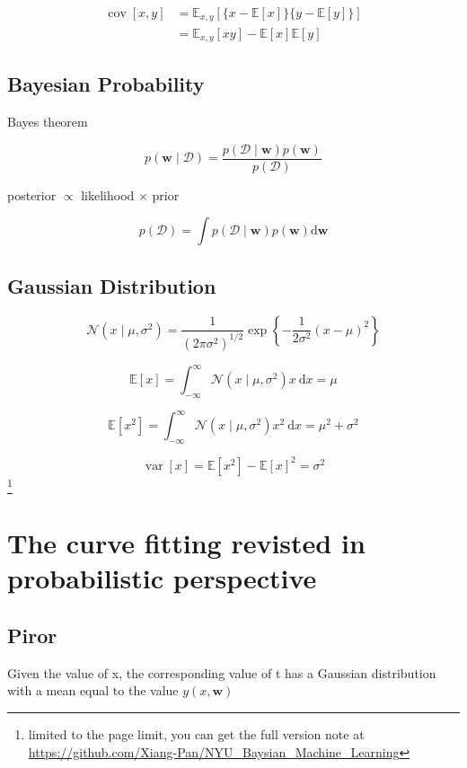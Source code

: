 \documentclass[11pt,en,cite=authoryear]{elegantpaper}
\begin{document}
$$\begin{aligned} \operatorname{cov}[x, y] &=\mathbb{E}_{x, y}[\{x-\mathbb{E}[x]\}\{y-\mathbb{E}[y]\}] \\ &=\mathbb{E}_{x, y}[x y]-\mathbb{E}[x] \mathbb{E}[y] \end{aligned}$$

\subsection{Bayesian Probability}
Bayes theorem

$$p(\mathbf{w} \mid \mathcal{D})=\frac{p(\mathcal{D} \mid \mathbf{w}) p(\mathbf{w})}{p(\mathcal{D})}$$

posterior $\propto$ likelihood $\times$ prior

$$p(\mathcal{D})=\int p(\mathcal{D} \mid \mathbf{w}) p(\mathbf{w}) \mathrm{d} \mathbf{w}$$

\subsection{Gaussian Distribution}
$$\mathcal{N}\left(x \mid \mu, \sigma^{2}\right)=\frac{1}{\left(2 \pi \sigma^{2}\right)^{1 / 2}} \exp \left\{-\frac{1}{2 \sigma^{2}}(x-\mu)^{2}\right\}$$

$$\mathbb{E}[x]=\int_{-\infty}^{\infty} \mathcal{N}\left(x \mid \mu, \sigma^{2}\right) x \mathrm{~d} x=\mu$$

$$\mathbb{E}\left[x^{2}\right]=\int_{-\infty}^{\infty} \mathcal{N}\left(x \mid \mu, \sigma^{2}\right) x^{2} \mathrm{~d} x=\mu^{2}+\sigma^{2}$$

$$\operatorname{var}[x]=\mathbb{E}\left[x^{2}\right]-\mathbb{E}[x]^{2}=\sigma^{2}$$
\footnote{limited to the page limit, you can get the full version note at \url{https://github.com/Xiang-Pan/NYU_Baysian_Machine_Learning} }

\section{The curve fitting revisted in probabilistic perspective}
\subsection{Piror}
Given the value of x, the corresponding value of t has a Gaussian distribution with a mean equal to the value $y(x, \mathbf{w})$
\end{document}
